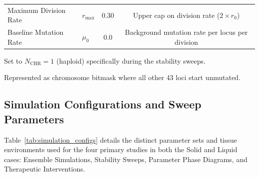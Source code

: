 \documentclass[11pt,a4paper]{article}
\begin{document}
\begin{table}[htbp]
{\begin{threeparttable}
\begin{tabular}{llcc}
Maximum Division Rate & $r_{\max}$ & 0.30 & Upper cap on division rate ($2 \times r_0$) \\
Baseline Mutation Rate & $\mu_0$ & 0.0 & Background mutation rate per locus per division \\
\bottomrule
\end{tabular}
\begin{tablenotes}
\small
\item[a] Set to $N_{\text{CHR}} = 1$ (haploid) specifically during the stability sweeps.
\item[b] Represented as chromosome bitmask where all other 43 loci start unmutated.
\end{tablenotes}
\end{threeparttable}
}%
\end{table}

\clearpage

\subsection{Simulation Configurations and Sweep Parameters}

Table~\ref{tab:simulation_configs} details the distinct parameter sets and tissue environments used for the four primary studies in both the Solid and Liquid cases: Ensemble Simulations, Stability Sweeps, Parameter Phase Diagrams, and Therapeutic Interventions.
\end{document}
